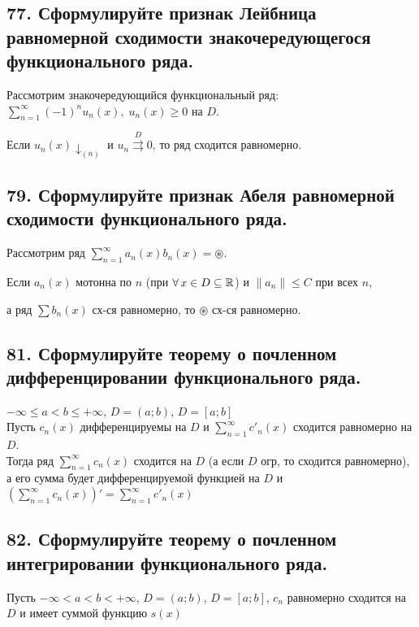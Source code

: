 \documentclass[a4paper, fleqn]{article}
\begin{document}
    
    \subsection*{77. Сформулируйте признак Лейбница равномерной сходимости знакочередующегося функционального ряда.}
    
    Рассмотрим знакочередующийся функциональный ряд: $\displaystyle \sum_{n = 1}^{\infty} (-1)^n u_n(x), \; u_n(x) \geq 0$ на $D$.
    
    Если $u_n(x) \downarrow_{(n)}$ и $u_n \stackrel{D}{\rightrightarrows} 0$, то ряд сходится равномерно.
        
        
    
    \subsection*{79. Сформулируйте признак Абеля равномерной сходимости функционального ряда.}
        
        Рассмотрим ряд $\displaystyle \sum_{n = 1}^{\infty} a_n(x) b_n(x) = \circledast$.
        
        Если $a_n(x)$ мотонна по $n$ (при $\forall \, x \in D \subseteq \mathbb{R}$) и $ \| a_n \| \leq C$ при всех $n$,
        
        а ряд $\sum b_n(x)$ сх-ся равномерно, то $\circledast$ сх-ся равномерно.
        
        
    \subsection*{81. Сформулируйте теорему о почленном дифференцировании функционального ряда.}
    $-\infty \leq a < b \leq +\infty$, $D= (a; b)$, $D = [a; b]$ \\
    Пусть $c_n(x)$ дифференцируемы на $D$ и $\sum_{n=1}^{\infty} c'_n(x)$ сходится равномерно на $D$. \\
    Тогда ряд $\sum_{n=1}^{\infty} c_n(x)$ сходится на $D$ (а если $D$ огр, то сходится равномерно), а его сумма будет дифференцируемой функцией на $D$ и $\left(\sum_{n=1}^{\infty} c_n(x)\right)' = \sum_{n=1}^{\infty} c'_n(x)$ \\
        
        \subsection*{82. Сформулируйте теорему о почленном интегрировании функционального ряда.}
        Пусть $-\infty < a < b < +\infty$, $D= (a; b)$, $D = [a; b]$, $c_n$ равномерно сходится на $D$ и имеет суммой функцию $s(x)$
\end{document}
